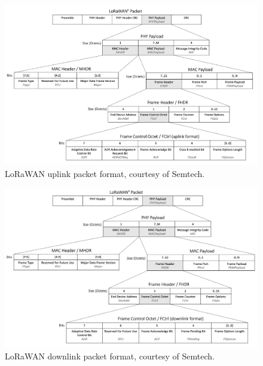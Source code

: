 \begin{figure}[ht]
    \centering
    \includegraphics[width=1.0\textwidth, trim={0 0 0 125pt}, clip]{uml/lorawan_uplink_format.pdf}
    \caption{LoRaWAN uplink packet format, courtesy of Semtech.}
    \label{img: lorawan uplink format}
\end{figure}

\begin{figure}[ht]
    \centering
    \includegraphics[width=1.0\textwidth, trim={0 0 0 115pt}, clip]{uml/lorawan_downlink_format.pdf}
    \caption{LoRaWAN downlink packet format, courtesy of Semtech.}
    \label{img: lorawan downlink format}
\end{figure}

